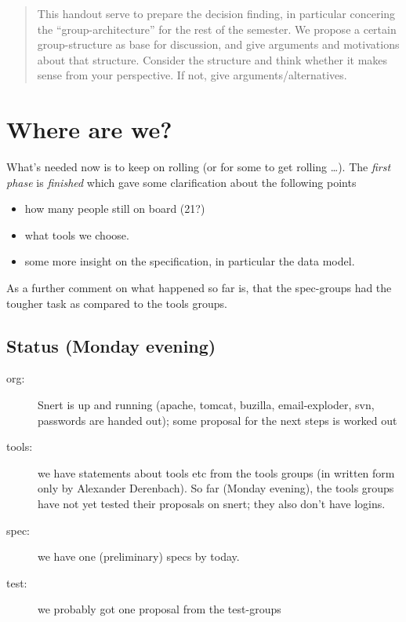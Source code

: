 \documentclass[11pt,handout]{handout}
\begin{document}
\thispagestyle{empty}





\begin{abstract}
  This handout serve to prepare the decision finding, in particular
  concering the ``group-architecture'' for the rest of the semester. We
  propose a certain group-structure as base for discussion, and give
  arguments and motivations about that structure. Consider the structure
  and think whether it makes sense from your perspective. If not, give
  arguments/alternatives.
\end{abstract}

\section*{Where are we?}



What's needed now is to keep on rolling (or for some to get rolling
\ldots). The \emph{first phase} is \emph{finished} which gave some
clarification about the following points

\begin{itemize}
\item how many people still on board (21?)
\item what tools we choose.
\item some more insight on the specification, in particular the data model.
\end{itemize}

As a further comment on what happened so far is, that the spec-groups had
the tougher task as compared to the tools groups.


\subsection*{Status (Monday evening)}




\begin{description}
\item[org:] Snert is up and running (apache, tomcat, buzilla,
  email-exploder, svn, passwords are handed out); some proposal for the
  next steps is worked out
\item[tools:] we have statements about tools etc from the tools groups (in
  written form only by Alexander Derenbach). So far (Monday evening), the
  tools groups have not yet tested their proposals on snert; they also
  don't have logins.
\item[spec:] we have one (preliminary) specs by today.
\item[test:] we probably got one proposal from the test-groups
\end{description}
\end{document}
